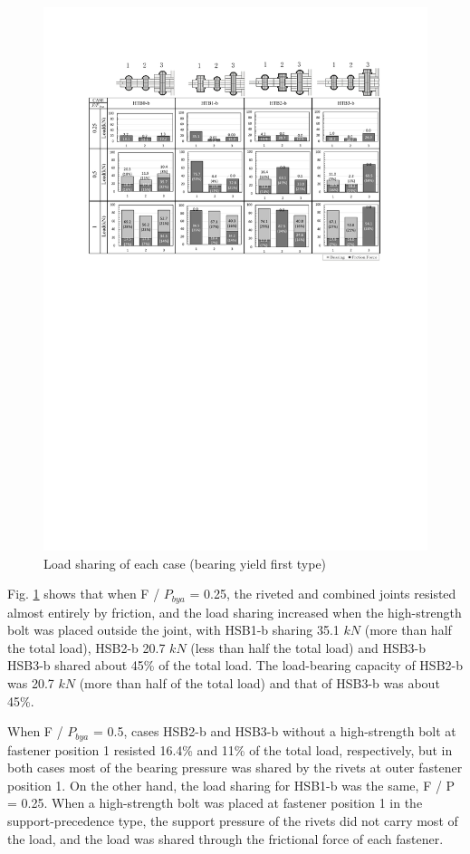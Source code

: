 \begin{figure}
    \centering
    \includegraphics[width=\textwidth]{imgs/ch4/fig18.pdf}
    \caption{Load sharing of each case (bearing yield first type)}
    \label{ch4fig18}
\end{figure}

Fig. \ref{ch4fig18} shows that when F / $P_{bya}$ = 0.25, the riveted and combined joints resisted almost entirely by friction, and the load sharing increased when the high-strength bolt was placed outside the joint, with HSB1-b sharing 35.1 $kN$ (more than half the total load), HSB2-b 20.7 $kN$ (less than half the total load) and HSB3-b HSB3-b shared about 45\% of the total load. The load-bearing capacity of HSB2-b was 20.7 $kN$ (more than half of the total load) and that of HSB3-b was about 45\%.

When F / $P_{bya}$ = 0.5, cases HSB2-b and HSB3-b without a high-strength bolt at fastener position 1 resisted 16.4\% and 11\% of the total load, respectively, but in both cases most of the bearing pressure was shared by the rivets at outer fastener position 1. On the other hand, the load sharing for HSB1-b was the same, F / P = 0.25. When a high-strength bolt was placed at fastener position 1 in the support-precedence type, the support pressure of the rivets did not carry most of the load, and the load was shared through the frictional force of each fastener.

